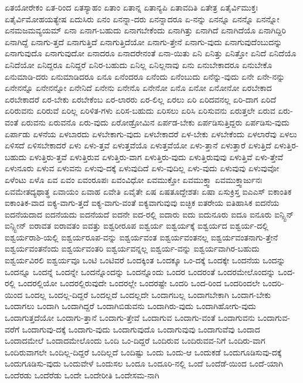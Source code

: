 {ಏತಯೋರೇಕಂ
ಏತ-ರಿಂದ
ಏತಸ್ಯಾಹಂ
ಏತಾಂ
ಏತಾನ್ನ
ಏತಾನ್ಯಪಿ
ಏತಾವದಿತಿ
ಏತೇತ್ರ
ಏತೈರ್ವಿಮುಕ್ತಃ
ಏತೈರ್ವಿಮೋಹಯತ್ಯೇಷ
ಏದುಸಿರು
ಏನಂ
ಏನನ್ನಾ-ದರು
ಏನನ್ನಾದರೂ
ಏ-ನನ್ನು
ಏನನ್ನೂ
ಏನನ್ನೊ
ಏನನ್ನೋ
ಏನಮಜಮವ್ಯಯಮ್
ಏನಾ
ಏನಾಗ-ಬಹುದು
ಏನಾಗಬೇಕೆಂದು
ಏನಾಗಿತ್ತು
ಏನಾಗಿದೆ
ಏನಾಗಿದೆಯೊ
ಏನಾಗಿದ್ದಿರಿ
ಏನಾಗಿದ್ದೆ
ಏನಾಗು-ತ್ತದೆ
ಏನಾಗುತ್ತಿದೆ
ಏನಾಗುತ್ತಿದೆಯೋ
ಏನಾಗು-ತ್ತೇನೆ
ಏನಾಗು-ವುದು
ಏನಾಗುವುದೆಂಬುದನ್ನು
ಏನಾಗುವುದೊ
ಏನಾಗುವುದೋ
ಏನಾದರೂ
ಏನಾದರೇನಂತೆ
ಏನಾ-ಯಿತು
ಏನಿ
ಏನಿತ್ತು
ಏನಿತ್ತೋ
ಏನಿದೆ
ಏನಿದೆಯೊ
ಏನಿದೆಯೋ
ಏನಿದ್ದರೂ
ಏನಿದ್ದರೆ
ಏನಿರ-ಬಹುದು
ಏನಿಲ್ಲ
ಏನಿಲ್ಲನಾವು
ಏನು
ಏನುಬೇಕಾದರೂ
ಏನುಬೇಕೊ
ಏನುಮಾಡಿ-ದರು
ಏನುಮಾಡಿದರೂ
ಏನೂ
ಏನೆಂದರೂ
ಏನೆಂದು
ಏನೆಂಬುದು
ಏನೆನ್ನು-ವುದು
ಏನೇ
ಏನೇ-ನನ್ನು
ಏನೇನನ್ನೊ
ಏನೇನನ್ನೋ
ಏನೇನಿದೆ
ಏನೇನು
ಏನೇನೊ
ಏನೇನೋ
ಏನೊ
ಏನೋ
ಏನೋನೋ
ಏರಬೇಕಾದ
ಏರಬೇಕಾದರೆ
ಏರ-ಬೇಕು
ಏರಬೇಕೆಂಬ
ಏರ-ಲಾರರು
ಏರ-ಲಿಲ್ಲ
ಏರಲು
ಏರಿ
ಏರಿದವನಲ್ಲ
ಏರಿ-ದಾಗ
ಏರಿದೆ
ಏರಿರುವನು
ಏರಿರುವೆ
ಏರಿಲ್ಲ
ಏರಿಳಿತ-ಗಳು
ಏರಿಸ-ಬಹುದು
ಏರಿಸಲು
ಏರಿಸಿ
ಏರಿಸುವನು
ಏರುತ್ತಲೇ
ಏರುವ
ಏರು-ವಂತೆ
ಏರುವನು
ಏರುವನೊ
ಏರು-ವುದು
ಏರೋಡ್ರೋಮಿನ
ಏರ್ಪಡ-ಬೇಕು
ಏರ್ಪಡಿಸುತ್ತಿದ್ದರು
ಏರ್ಪಡಿಸು-ವುದು
ಏರ್ಪಾಡು
ಏಳನೆಯ
ಏಳಬಾರದು
ಏಳಬೇಕಾಗು-ವುದು
ಏಳಬೇಕಾದರೆ
ಏಳ-ಬೇಕು
ಏಳಬೇಕೆಂದು
ಏಳಲಾರೆವು
ಏಳಲು
ಏಳಿಸದೆ
ಏಳಿಸಬೇಕಾದರೆ
ಏಳು
ಏಳು-ತ್ತವೆ
ಏಳುತ್ತವೆಯೊ
ಏಳುತ್ತವೆಯೋ
ಏಳು-ತ್ತಾನೆ
ಏಳುತ್ತಾರೆ
ಏಳುತ್ತಿದೆ
ಏಳುತ್ತಿರ-ಬಹುದು
ಏಳುತ್ತಿರು-ತ್ತವೆ
ಏಳುತ್ತಿರುವ
ಏಳುತ್ತಿರು-ವಾಗ
ಏಳುತ್ತಿರು-ವುದು
ಏಳುತ್ತಿರುವುವು
ಏಳುತ್ತಿವೆ
ಏಳು-ತ್ತೇವೆ
ಏಳುನೂರು
ಏಳುವ
ಏಳುವನು
ಏಳುವು-ದಕ್ಕೆ
ಏಳುವುದಿದೆ
ಏಳು-ವುದಿಲ್ಲ
ಏಳು-ವುದು
ಏಳುವುವು
ಏಳುವುವೋ
ಏಳೆಂಟು
ಏಳೊ
ಏವ
ಏವಂ
ಏವಂರೂಪಃ
ಏವಂವಿಧೋ
ಏವಮುಕ್ತೋ
ಏವಮುಕ್ತ್ವಾ
ಏವಮುಕ್ತ್ವಾರ್ಜುನಃ
ಏವಮೇತದ್ಯಥಾತ್ಥ
ಏವಾಯಂ
ಏವಾಹ
ಏವೇತಿ
ಏವೈತೇ
ಏಷ
ಏಷತೂದ್ದೇಶತಃ
ಏಷಾ
ಏಸುಕ್ರಿಸ್ತ
ಐಎಎಸ್
ಐಕಾಂತಿಕ
ಐಕಾಂತಿಕ-ವಾದ
ಐಕ್ಯ-ವಾಗು-ತ್ತದೆ
ಐಕ್ಯ-ವಾಗು-ವಂತೆ
ಐಕ್ಯವಾಗುವುವು
ಐಚ್ಛಿಕ
ಐತರೇಯ
ಐತಿಹಾಸಿಕ
ಐದನೆಯ
ಐದನೆಯದಾದ
ಐದನೆಯದು
ಐದನೆಯದೆ
ಐದನೇ
ಐದ-ರಲ್ಲಿ
ಐದಾರು
ಐದು
ಐದುನೂರು
ಐದೂ
ಐನೂರು
ಐನ್ಸ್ಟಿನ್
ಐನ್ಸ್ಟೀನ್
ಐರಾವತ
ಐರಾವತಂ
ಐವತ್ತು
ಐಶ್ವರೀರೂಪ
ಐಶ್ವರ್ಯ
ಐಶ್ವರ್ಯಕ್ಕೆ
ಐಶ್ವರ್ಯದ
ಐಶ್ವರ್ಯ-ದಲ್ಲಿ
ಐಶ್ವರ್ಯರಾಶಿ-ಯಲ್ಲಿ
ಐಶ್ವರ್ಯರೂಪ-ವನ್ನು
ಐಶ್ವರ್ಯವಂತ
ಐಶ್ವರ್ಯವಂತನಲ್ಲ
ಐಶ್ವರ್ಯವಂತನಾಗು-ತ್ತೇನೆ
ಐಶ್ವರ್ಯವಂತನೆಂದು
ಐಶ್ವರ್ಯವಂತರಿ
ಐಶ್ವರ್ಯವನ್ನಲ್ಲ
ಐಶ್ವರ್ಯ-ವನ್ನು
ಐಶ್ವರ್ಯವಾಗಿರ-ಬಹುದು
ಐಶ್ವರ್ಯವಿರಲಿ
ಐಶ್ವರ್ಯವೂ
ಒಂಟಿ
ಒಂಟಿವರೆ
ಒಂದಕ್ಕಿಂತ
ಒಂದಕ್ಕೂ
ಒಂ-ದಕ್ಕೆ
ಒಂದಕ್ಕೇ
ಒಂದನೆಯ
ಒಂದನ್ನು
ಒಂದನ್ನೂ
ಒಂದನ್ನೆ
ಒಂದನ್ನೇ
ಒಂದನ್ನೊಂದನ್ನು
ಒಂದನ್ನೊಂದು
ಒಂದರ
ಒಂದರಂತೆ
ಒಂದರಮೇಲೊಂದನ್ನು
ಒಂದ-ರಲ್ಲಿ
ಒಂದರಲ್ಲಿಯೋ
ಒಂದರಲ್ಲಿರುವುದೇ
ಒಂದರಲ್ಲೇ
ಒಂದರಷ್ಟೇ
ಒಂದರಿ
ಒಂದ-ರಿಂದ
ಒಂದರಿಂದಲೇ
ಒಂದರಿ-ಯಿಂದ
ಒಂದಲ್ಲ
ಒಂದಲ್ಲ-ದಿದ್ದರೆ
ಒಂದಲ್ಲದೆ
ಒಂದಲ್ಲದೇ
ಒಂದಾಗಬಲ್ಲ
ಒಂದಾಗಬೇಕಾಗಿ
ಒಂದಾಗ-ಬೇಕು
ಒಂದಾಗಲು
ಒಂದಾಗಿ
ಒಂದಾಗಿದ್ದರೆ
ಒಂದಾಗಿಬಿಡುವನು
ಒಂದಾಗಿರು-ವುದು
ಒಂದಾಗಿಹೋಗು-ವುದು
ಒಂದಾಗುತ್ತದೆಯೋ
ಒಂದಾಗು-ತ್ತಾನೆ
ಒಂದಾಗು-ತ್ತೇವೆ
ಒಂದಾಗುವ
ಒಂದಾಗು-ವಂತೆ
ಒಂದಾಗುವನು
ಒಂದಾಗುವ-ವರೆಗೆ
ಒಂದಾಗುವು-ದಕ್ಕೆ
ಒಂದಾಗು-ವುದು
ಒಂದಾಗುವುದೊ
ಒಂದಾಗುವುವು
ಒಂದಾಗುವೆವು
ಒಂದಾದ
ಒಂದಾದಮೇಲೆ
ಒಂದಾದಮೇಲೊಂದು
ಒಂದಿ
ಒಂ-ದಿದ್ದರೆ
ಒಂದಿರುವ
ಒಂದಿರುವವ-ನಿಗೆ
ಒಂದಿರು-ವಾಗ
ಒಂದಿರುವಾಗಲೇ
ಒಂದಿಲ್ಲ-ದಿದ್ದರೆ
ಒಂದಿಲ್ಲದೆ
ಒಂದಿಷ್ಟು
ಒಂದು
ಒಂದು-ಆ
ಒಂದುಕಡೆ
ಒಂದುಗೂಡಿಸುವು-ದಕ್ಕೆ
ಒಂದುಗೂಡಿಸು-ವುದು
ಒಂದುವೇಳೆ
ಒಂದುಸಲ
ಒಂದೂ
ಒಂದೂರಿ-ನಲ್ಲಿ
ಒಂದೆ
ಒಂದೆಡೆ-ಯಿಂದ
ಒಂದೆ-ಯಾಗಿ
ಒಂದೆರಡು
ಒಂದೆರೆಡು
ಒಂದೇ
ಒಂದೇರೀತಿ
ಒಂದೇಸಮ-ನಾಗಿ
}
